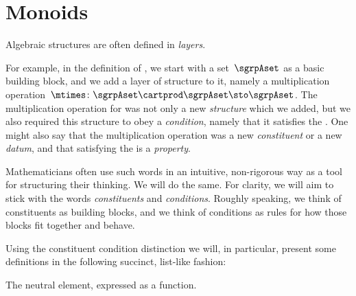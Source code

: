 
\section{Monoids}
\label{sec:parallelism-monoids}

Algebraic structures are often defined in \emph{layers}.

For example, in the definition of , we start with a set~$\sgrpAset$ as a basic building block, and we add a layer of structure to it, namely a multiplication operation~$\mtimes \colon \sgrpAset \cartprod \sgrpAset \sto \sgrpAset$.
The multiplication operation for  was not only a new \emph{structure} which we added, but we also required this structure to obey a \emph{condition}, namely that it satisfies the .
One might also say that the multiplication operation was a new \emph{constituent} or a new \emph{datum}, and that satisfying the  is a \emph{property}.

Mathematicians often use such words in an intuitive, non-rigorous way as a tool for structuring their thinking.
We will do the same.
For clarity, we will aim to stick with the words \emph{constituents} and \emph{conditions}.
Roughly speaking, we think of constituents as building blocks, and we think of conditions as rules for how those blocks fit together and behave.

Using the constituent \vs condition distinction we will, in particular, present some definitions in the following succinct, list-like fashion:

\begin{marginfigure}
    \centering
    \caption{The neutral element, expressed as a function.}
    \label{fig:monoid-diagram}
\end{marginfigure}

